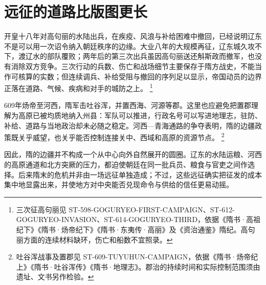 \section{远征的道路比版图更长}
\label{sec:sui-frontiers}

开皇十八年对高句丽的水陆出兵，在疾疫、风浪与补给困难中撤回，已经说明辽东不是可以用一次诏令纳入朝廷秩序的边缘。大业八年的大规模再征，辽东城久攻不下，渡辽水的部队覆败；两年后的第三次出兵虽因高句丽送还斛斯政而撤军，也没有消除双方竞争。三次行动的兵数、伤亡和战场细节主要保存于隋方战史，不能当作可核算的实数；但连续调兵、补给受阻与撤回的序列足以显示，帝国动员的边界正落在道路、气候、疾病和对手的城防之上。%
\footnote{三次征高句丽见 ST-598-GOGURYEO-FIRST-CAMPAIGN、ST-612-GOGURYEO-INVASION、ST-614-GOGURYEO-THIRD，依据《隋书·高祖纪下》《隋书·炀帝纪下》《隋书·东夷传·高丽》及《资治通鉴》隋纪。高句丽方面的连续材料缺环，伤亡和船数不宜照录。}

609年炀帝至河西，隋军击吐谷浑，并置西海、河源等郡。这里也应避免把置郡理解为高原已被均质地纳入州县：军队可以推进，行政名号可以写进地理志，驻防、补给、道路与当地政治却未必随之稳定。河西—青海通路的争夺表明，隋的边疆政策既关乎威望，也关乎能否控制连接关中、西域和高原的资源节点。%
\footnote{吐谷浑战事及置郡见 ST-609-TUYUHUN-CAMPAIGN，依据《隋书·炀帝纪上》《隋书·吐谷浑传》《隋书·地理志》。郡治的持续时间和实际控制范围须由遗址、文书另作检验。}

因此，隋的边疆并不构成一个从中心向外自然展开的圆圈。辽东的水陆运粮、河西的高原通道和北方突厥的压力，都迫使朝廷在同一批兵员、粮食与官吏之间作选择。后来隋末的危机并非由一场远征单独造成；不过，这些远征确实把征发的成本集中地显露出来，并使地方对中央能否兑现命令与供给的信任更易动摇。
